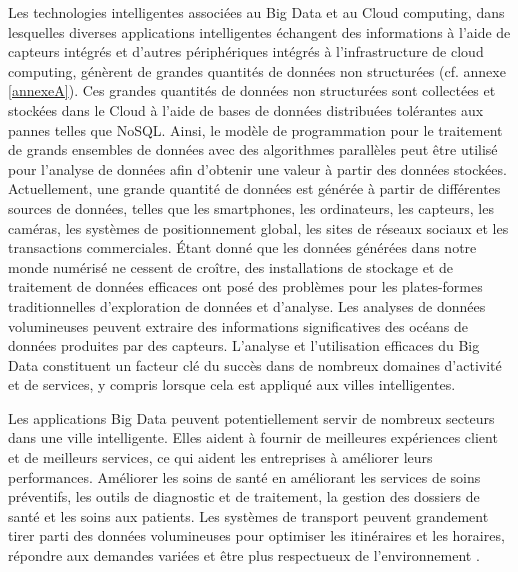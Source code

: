 \documentclass[french, a4paper, 12pt]{report}
\begin{document}
Les technologies intelligentes associées au Big Data et au Cloud computing, dans lesquelles diverses applications intelligentes échangent des informations à l'aide de capteurs intégrés et d'autres périphériques intégrés à l'infrastructure de cloud computing, génèrent de grandes quantités de données non structurées (cf. annexe \ref{annexeA}). Ces grandes quantités de données non structurées sont collectées et stockées dans le Cloud à l'aide de bases de données distribuées tolérantes aux pannes telles que NoSQL. Ainsi, le modèle de programmation pour le traitement de grands ensembles de données avec des algorithmes parallèles peut être utilisé pour l'analyse de données afin d'obtenir une valeur à partir des données stockées.
Actuellement, une grande quantité de données est générée à partir de différentes sources de données, telles que les smartphones, les ordinateurs, les capteurs, les caméras, les systèmes de positionnement global, les sites de réseaux sociaux et les transactions commerciales. Étant donné que les données générées dans notre monde numérisé ne cessent de croître, des installations de stockage et de traitement de données efficaces ont posé des problèmes pour les plates-formes traditionnelles d'exploration de données et d'analyse. Les analyses de données volumineuses peuvent extraire des informations significatives des océans de données produites par des capteurs. L'analyse et l'utilisation efficaces du Big Data constituent un facteur clé du succès dans de nombreux domaines d'activité et de services, y compris lorsque cela est appliqué aux villes intelligentes.

Les applications Big Data peuvent potentiellement servir de nombreux secteurs dans une ville intelligente. Elles aident à fournir de meilleures expériences client et de meilleurs services, ce qui aident les entreprises à améliorer leurs performances. Améliorer les soins de santé en améliorant les services de soins préventifs, les outils de diagnostic et de traitement, la gestion des dossiers de santé et les soins aux patients. Les systèmes de transport peuvent grandement tirer parti des données volumineuses pour optimiser les itinéraires et les horaires, répondre aux demandes variées et être plus respectueux de l'environnement \cite{5}.
\end{document}
